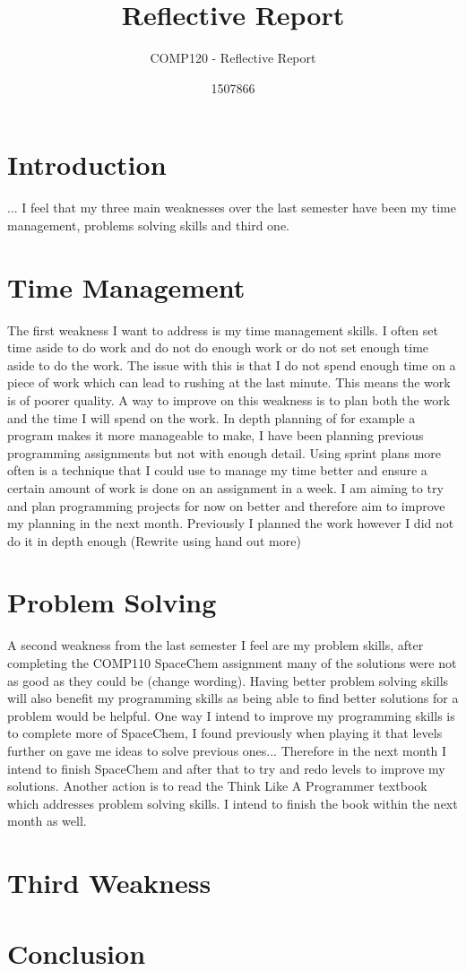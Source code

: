 \documentclass{scrartcl}
\title{Reflective Report}
\subtitle{COMP120 - Reflective Report}
\author{1507866}
\begin{document}
	
\maketitle
	
	
\section{Introduction}
...
I feel that my three main weaknesses over the last semester have been my time management, problems solving skills and third one.
	
\section{Time Management}
The first weakness I want to address is my time management skills. I often set time aside to do work and do not do enough work or do not set enough time aside to do the work. The issue with this is that I do not spend enough time on a piece of work which can lead to rushing at the last minute. This means the work is of poorer quality.
 A way to improve on this weakness is to plan both the work and the time I will spend on the work. In depth planning of for example a program makes it more manageable to make, I have been planning previous programming assignments but not with enough detail. Using sprint plans more often is a technique that I could use to manage my time better and ensure a certain amount of work is done on an assignment in a week. I am aiming to try and plan programming projects for now on better and therefore aim to improve my planning in the next month.  Previously I planned the work however I did not do it in depth enough
(Rewrite using hand out more)


\section{Problem Solving}
A second weakness from the last semester I feel are my problem skills, after completing the COMP110 SpaceChem assignment many of the solutions were not as good as they could be (change wording). Having better problem solving skills will also benefit my programming skills as being able to find better solutions for a problem would be helpful. 
One way I intend to improve my programming skills is to complete more of SpaceChem, I found previously when playing it that levels further on gave me ideas to solve previous ones... Therefore in the next month I intend to finish SpaceChem and after that to try and redo levels to improve my solutions. Another action is to read the Think Like A Programmer textbook which addresses problem solving skills. I intend to finish the book within the next month as well. 

\section{Third Weakness}

		
\section{Conclusion}
	


	
\end{document}
